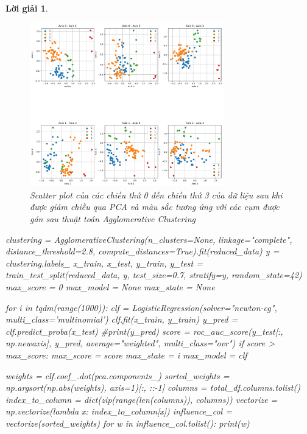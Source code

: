 \documentclass[14pt, a4paper]{article}
\theoremstyle{sltheorem}
\theoremstyle{soltheorem}
\newtheorem*{loigiai}{Lời giải}
\begin{document}
\begin{loigiai}
    \begin{figure}[h!]
        \centering
        \includegraphics[width=0.75\textwidth]{figures/pca_scattering_4_dim_clustering.png}
        \caption{Scatter plot của các chiều thứ 0 đến chiều thứ 3 của dữ liệu sau khi được giảm chiều qua PCA và màu sắc tương ứng với các cụm được gán sau thuật toán Agglomerative Clustering}
        \label{fig:pca-scattering-4-dim-clustering}
    \end{figure}

    \begin{python}
clustering = AgglomerativeClustering(n_clusters=None, linkage="complete", distance_threshold=2.8, compute_distances=True).fit(reduced_data)
y = clustering.labels_
x_train, x_test, y_train, y_test = train_test_split(reduced_data, y, test_size=0.7, stratify=y, random_state=42)
max_score = 0
max_model = None
max_state = None

for i in tqdm(range(1000)):
    clf = LogisticRegression(solver="newton-cg", multi_class='multinomial')
    clf.fit(x_train, y_train)
    y_pred = clf.predict_proba(x_test)
    #print(y_pred)
    score = roc_auc_score(y_test[:, np.newaxis], y_pred, average="weighted", multi_class="ovr")
    if score > max_score:
        max_score = score
        max_state = i
        max_model = clf
    \end{python}

    \begin{python}
weights = clf.coef_.dot(pca.components_)
sorted_weights = np.argsort(np.abs(weights), axis=1)[:, ::-1]
columns = total_df.columns.tolist()
index_to_column = dict(zip(range(len(columns)), columns))
vectorize = np.vectorize(lambda x: index_to_column[x])
influence_col = vectorize(sorted_weights)
for w in influence_col.tolist():
print(w)
    \end{python}


\end{loigiai}
\end{document}
